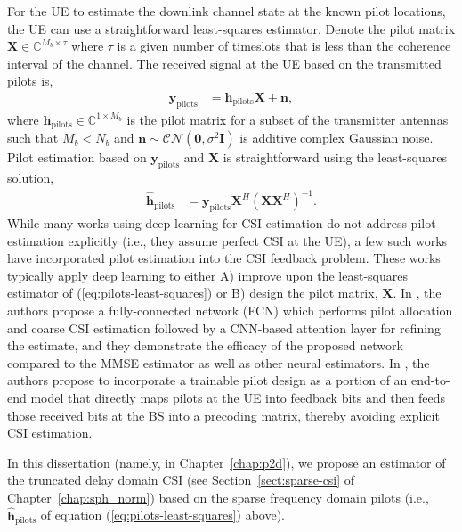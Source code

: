 For the UE to estimate the downlink channel state at the known pilot locations, the UE can use a straightforward least-squares estimator. Denote the pilot matrix $\mathbf{X}\in\mathbb{C}^{M_b \times \tau}$ where $\tau$ is a given number of timeslots that is less than the coherence interval of the channel. The received signal at the UE based on the transmitted pilots is,
\begin{align}
	\mathbf{y}_{\text{pilots}} &= \mathbf{h}_{\text{pilots}}\mathbf{X} + \mathbf{n},
\end{align}
where $\mathbf{h}_{\text{pilots}}\in\mathbb{C}^{1\times M_b}$ is the pilot matrix for a subset of the transmitter antennas such that $M_b < N_b$ and $\mathbf{n}\sim\mathcal{CN}(\mathbf{0},\sigma^2\mathbf{I})$ is additive complex Gaussian noise. Pilot estimation based on $\mathbf{y}_{\text{pilots}}$ and $\mathbf{X}$ is straightforward using the least-squares solution,
\begin{align}
	\hat{\mathbf{h}}_{\text{pilots}} &= \mathbf{y}_{\text{pilots}}\mathbf{X}^H(\mathbf{X}\mathbf{X}^H)^{-1}. \label{eq:pilots-least-squares}
\end{align}
While many works using deep learning for CSI estimation do not address pilot estimation explicitly (i.e., they assume perfect CSI at the UE), a few such works have incorporated pilot estimation into the CSI feedback problem. These works typically apply deep learning to either A) improve upon the least-squares estimator of (\ref{eq:pilots-least-squares}) or B) design the pilot matrix, $\mathbf{X}$. In \cite{ref:mashhadi2021pruning}, the authors propose a fully-connected network (FCN) which performs pilot allocation and coarse CSI estimation followed by a CNN-based attention layer for refining the estimate, and they demonstrate the efficacy of the proposed network compared to the MMSE estimator as well as other neural estimators. In \cite{ref:sohrabi2021distributed}, the authors propose to incorporate a trainable pilot design as a portion of an end-to-end model that directly maps pilots at the UE into feedback bits and then feeds those received bits at the BS into a precoding matrix, thereby avoiding explicit CSI estimation.

In this dissertation (namely, in Chapter~\ref{chap:p2d}), we propose an estimator of the truncated delay domain CSI (see Section~\ref{sect:sparse-csi} of Chapter~\ref{chap:sph_norm}) based on the sparse frequency domain pilots (i.e., $\hat{\mathbf{h}}_{\text{pilots}}$ of equation (\ref{eq:pilots-least-squares}) above).

